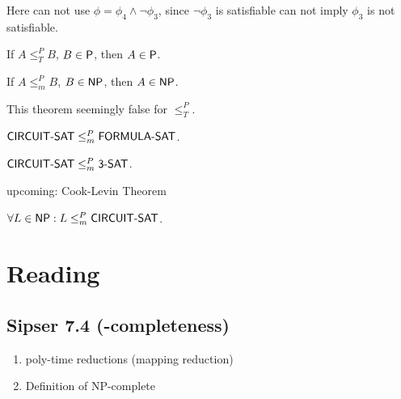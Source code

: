 \documentclass{article}
\begin{document}
\begin{remark}
  Here can not use \( \phi = \phi_4 \wedge \neg \phi_3 \), since \(\neg \phi_3\) is satisfiable can not imply \(\phi_3\) is not satisfiable.
\end{remark}

\begin{theorem}
  If \(A \leq_T^P B\), \(B \in \P\), then \(A \in \P\).
\end{theorem}

\begin{theorem}
  If \(A \leq_m^P B\), \(B \in \NP\), then \(A \in \NP\).
\end{theorem}

\begin{remark}
  This theorem seemingly false for \(\leq_T^P\).
\end{remark}

\begin{theorem}
  \( \prob{CIRCUIT-SAT} \leq_m^P \prob{FORMULA-SAT} \).
\end{theorem}

\begin{theorem}
  \( \prob{CIRCUIT-SAT} \leq_m^P \prob{3-SAT} \).
\end{theorem}

upcoming: Cook-Levin Theorem

\begin{theorem}
  \( \forall L \in \NP : L \leq_m^P \prob{CIRCUIT-SAT} \).
\end{theorem}

\section{Reading}

\subsection{Sipser 7.4 (\NP-completeness)}

\begin{enumerate}
  \item poly-time reductions (mapping reduction)
  \item Definition of NP-complete
\end{enumerate}
\end{document}
